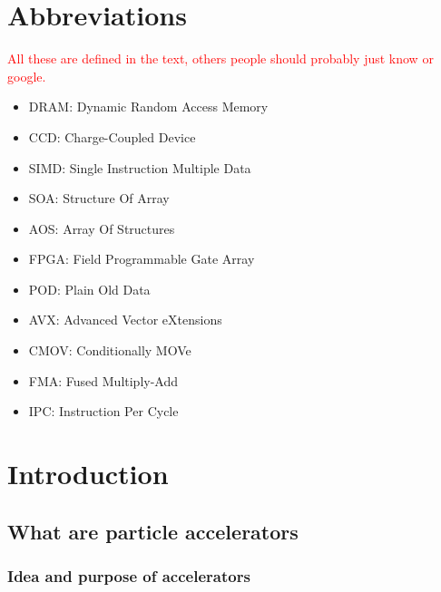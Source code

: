 \documentclass[12pt]{article}
\begin{document}
\newpage
{
	\small
	\hypersetup{linkcolor=black}
	\tableofcontents
}

{
	\small
	\hypersetup{linkcolor=black}
	\listoffigures
}

{
	\small
	\hypersetup{linkcolor=black}
	\listoftables
}



\section*{Abbreviations}

\textcolor{red}{All these are defined in the text, others people should probably just know or google.}

\begin{itemize}
	\item DRAM: Dynamic Random Access Memory
	\item CCD: Charge-Coupled Device
	\item SIMD: Single Instruction Multiple Data
	\item SOA: Structure Of Array
	\item AOS: Array Of Structures
	\item FPGA: Field Programmable Gate Array
	\item POD: Plain Old Data
	\item AVX: Advanced Vector eXtensions
	\item CMOV: Conditionally MOVe
	\item FMA: Fused Multiply-Add
	\item IPC: Instruction Per Cycle
\end{itemize}


\newpage
\section{Introduction}\label{sec_intro}

\subsection{What are particle accelerators}\label{sec_part_accel_intro}

\subsubsection{Idea and purpose of accelerators}\label{sec_part_accel_idea}
\end{document}
